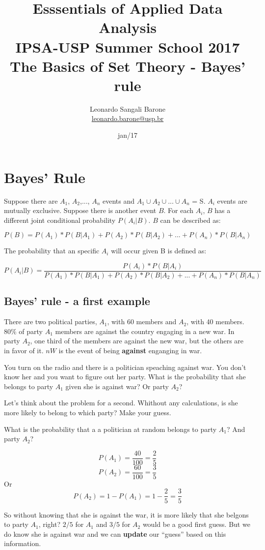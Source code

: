 \documentclass[11pt]{article}
\title{\textbf{Esssentials of Applied Data Analysis\\
				IPSA-USP Summer School 2017}\newline\\
				The Basics of Set Theory - Bayes' rule}
\author{Leonardo Sangali Barone\\ \href{leonardo.barone@usp.br}{leonardo.barone@usp.br}}
\date{jan/17}
\begin{document}
\maketitle

\section*{Bayes' Rule}

	Suppose there are $A_1$, $A_2$,..., $A_n$ events and $A_1 \cup A_2 \cup... \cup A_n$ = S. $A_i$ events are mutually exclusive. Suppose there is another event $B$. For each $A_i$, $B$ has a different joint conditional probability $P(A_i|B)$. $B$ can be described as:
	
	\[P(B) = P(A_1)*P(B|A_1)+P(A_2)*P(B|A_2)+...+P(A_n)*P(B|A_n)\]
 
	The probability that an specific $A_i$ will occur given B is defined as:

	\[P(A_i|B) = \frac{P(A_i)*P(B|A_i)}{P(A_1)*P(B|A_1)+P(A_2)*P(B|A_2)+...+P(A_n)*P(B|A_n)}\]
		
	\subsection*{Bayes' rule - a first example}
	
	There are two political parties, $A_1$, with 60 members and $A_2$, with 40 members. $80\%$ of party $A_1$ members are against the country engaging in a new war. In party $A_2$, one third of the members are against the new war, but the others are in favor of it. $nW$ is the event of being \textbf{against} enganging in war.

	You turn on the radio and there is a politician speaching against war. You don't know her and you want to figure out her party. What is the probability that she belongs to party $A_1$ given she is against war? Or party $A_2$?
		
	Let's think about the problem for a second. Whithout any calculations, is she more likely to belong to which party? Make your guess.
	
	What is the probability that a a politician at random belongs to party $A_1$? And party $A_2$?
	
	\[P(A_1) = \frac{40}{100} = \frac{2}{5} \]
	\[P(A_2) = \frac{60}{100} = \frac{3}{5} \]
Or
	\[P(A_2) = 1 - P(A_1) = 1 - \frac{2}{5} = \frac{3}{5}\]
	
	So without knowing that she is against the war, it is more likely that she belgons to party $A_1$, right? $2/5$ for $A_1$ and $3/5$ for $A_2$ would be a good first guess. But we do know she is against war and we can \textbf{update} our ``guess'' based on this information.
\end{document}
